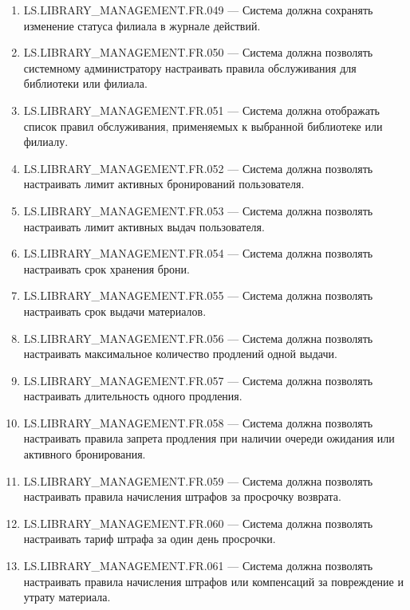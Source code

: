 \documentclass[12pt,a4paper]{article}
\begin{document}
\begin{enumerate}
		\item LS.LIBRARY\_MANAGEMENT.FR.049 --- Система должна сохранять изменение статуса
		филиала в журнале действий.
		
		\item LS.LIBRARY\_MANAGEMENT.FR.050 --- Система должна позволять системному
		администратору настраивать правила обслуживания для библиотеки или филиала.
		
		\item LS.LIBRARY\_MANAGEMENT.FR.051 --- Система должна отображать список правил
		обслуживания, применяемых к выбранной библиотеке или филиалу.
		
		\item LS.LIBRARY\_MANAGEMENT.FR.052 --- Система должна позволять настраивать
		лимит активных бронирований пользователя.
		
		\item LS.LIBRARY\_MANAGEMENT.FR.053 --- Система должна позволять настраивать
		лимит активных выдач пользователя.
		
		\item LS.LIBRARY\_MANAGEMENT.FR.054 --- Система должна позволять настраивать
		срок хранения брони.
		
		\item LS.LIBRARY\_MANAGEMENT.FR.055 --- Система должна позволять настраивать
		срок выдачи материалов.
		
		\item LS.LIBRARY\_MANAGEMENT.FR.056 --- Система должна позволять настраивать
		максимальное количество продлений одной выдачи.
		
		\item LS.LIBRARY\_MANAGEMENT.FR.057 --- Система должна позволять настраивать
		длительность одного продления.
		
		\item LS.LIBRARY\_MANAGEMENT.FR.058 --- Система должна позволять настраивать
		правила запрета продления при наличии очереди ожидания или активного
		бронирования.
		
		\item LS.LIBRARY\_MANAGEMENT.FR.059 --- Система должна позволять настраивать
		правила начисления штрафов за просрочку возврата.
		
		\item LS.LIBRARY\_MANAGEMENT.FR.060 --- Система должна позволять настраивать
		тариф штрафа за один день просрочки.
		
		\item LS.LIBRARY\_MANAGEMENT.FR.061 --- Система должна позволять настраивать
		правила начисления штрафов или компенсаций за повреждение и утрату материала.
		

\end{enumerate}
\end{document}
